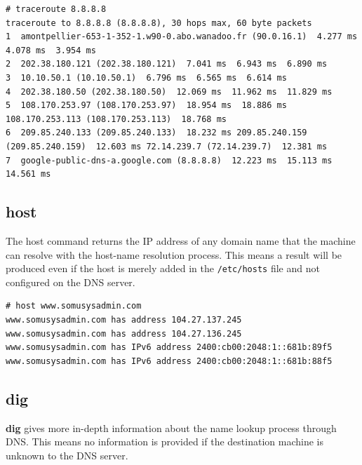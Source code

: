 \vspace{-15pt}
\begin{verbatim}
# traceroute 8.8.8.8
traceroute to 8.8.8.8 (8.8.8.8), 30 hops max, 60 byte packets
1  amontpellier-653-1-352-1.w90-0.abo.wanadoo.fr (90.0.16.1)  4.277 ms  4.078 ms  3.954 ms
2  202.38.180.121 (202.38.180.121)  7.041 ms  6.943 ms  6.890 ms
3  10.10.50.1 (10.10.50.1)  6.796 ms  6.565 ms  6.614 ms
4  202.38.180.50 (202.38.180.50)  12.069 ms  11.962 ms  11.829 ms
5  108.170.253.97 (108.170.253.97)  18.954 ms  18.886 ms 108.170.253.113 (108.170.253.113)  18.768 ms
6  209.85.240.133 (209.85.240.133)  18.232 ms 209.85.240.159 (209.85.240.159)  12.603 ms 72.14.239.7 (72.14.239.7)  12.381 ms
7  google-public-dns-a.google.com (8.8.8.8)  12.223 ms  15.113 ms  14.561 ms
\end{verbatim}
\vspace{-10pt}

\subsection{host}
The host command returns the IP address of any domain name that the machine can resolve with the host-name resolution process. This means a result will be produced even if the host is merely added in the \verb|/etc/hosts| file and not configured on the DNS server. 

\vspace{-15pt}
\begin{verbatim}
# host www.somusysadmin.com
www.somusysadmin.com has address 104.27.137.245
www.somusysadmin.com has address 104.27.136.245
www.somusysadmin.com has IPv6 address 2400:cb00:2048:1::681b:89f5
www.somusysadmin.com has IPv6 address 2400:cb00:2048:1::681b:88f5
\end{verbatim}
\vspace{-10pt}

\subsection{dig}
\textbf{dig} gives more in-depth information about the name lookup process through DNS. This means no information is provided if the destination machine is unknown to the DNS server. 

